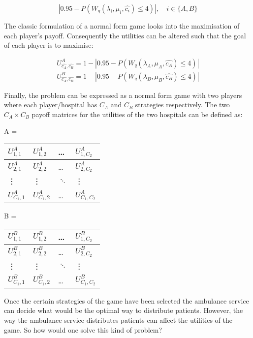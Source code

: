 \documentclass{article}
\begin{document}
\begin{equation}
    |0.95 - P(W_q(\lambda_i, \mu_i, \hat{c_i}) \leq 4)|, \quad i \in \{A,B\}
\end{equation}

The classic formulation of a normal form game looks into the maximisation of each player's payoff. Consequently the utilities can be altered such that the goal of each player is to maximise:

\begin{align}\label{Utilities}
    U_{\hat{c_A}, \hat{c_B}} ^ {A} = 1 - |0.95 - P(W_q(\lambda_A, \mu_A, \hat{c_A}) \leq 4)| \\
    U_{\hat{c_A}, \hat{c_B}} ^ {B} = 1 - |0.95 - P(W_q(\lambda_B, \mu_B, \hat{c_B}) \leq 4)|
\end{align}

Finally, the problem can be expressed as a normal form game with two players where each player/hospital has \( C_A \) and \( C_B \) strategies respectively. The two \( C_A \times C_B \) payoff matrices for the utilities of the two hospitals can be defined as:

\begin{table}[h]
    \centering
    \begin{minipage}{.5\linewidth}
        A = 
        \begin{tabular}{|l|l|l|l|}
            \hline
            \( U_{1,1}^A \) & \( U_{1,2}^A \) & \dots & \( U_{1,C_2}^A \) \\ \hline
            \( U_{2,1}^A \) & \( U_{2,2}^A \) & \dots & \( U_{2,C_2}^A \) \\ \hline
            \vdots & \vdots & \( \ddots \) & \vdots \\ \hline
            \( U_{C_1,1}^A \) & \( U_{C_1,2}^A \) & \dots & \( U_{C_1,C_2}^A \) \\ \hline
        \end{tabular}
    \end{minipage}%
    \begin{minipage}{.5\linewidth}
        B = 
        \begin{tabular}{|l|l|l|l|}
            \hline
            \( U_{1,1}^B \) & \( U_{1,2}^B \) & \dots & \( U_{1,C_2}^B \) \\ \hline
            \( U_{2,1}^B \) & \( U_{2,2}^B \) & \dots & \( U_{2,C_2}^B \) \\ \hline
            \vdots & \vdots & \( \ddots \) & \vdots \\ \hline
            \( U_{C_1,1}^B \) & \( U_{C_1,2}^B \) & \dots & \( U_{C_1,C_2}^B \) \\ \hline
        \end{tabular}
    \end{minipage}
\end{table}  
Once the certain strategies of the game have been selected the ambulance service can decide what would be the optimal way to distribute patients. However, the way the ambulance service distributes patients can affect the utilities of the game. So how would one solve this kind of problem?
 
\end{document}

